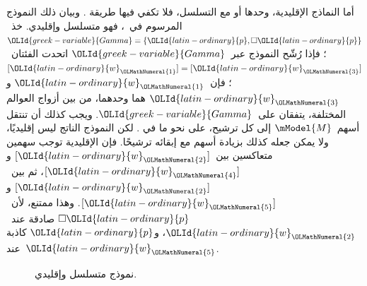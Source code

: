 \documentclass[../../../include/open-logic-section]{subfiles}
\begin{document}


أما النماذج الإقليدية، وحدها أو مع التسلسل، فلا تكفي فيها طريقة
. وبيان ذلك النموذج المرسوم في~،
فهو متسلسل وإقليدي. خذ~${\OLId{greek-variable}{Gamma}}=\{{\OLId{latin-ordinary}{p}},\Box {\OLId{latin-ordinary}{p}}\}$؛ فإذا رُشّح النموذج
عبر~${\OLId{greek-variable}{Gamma}}$ اتحدت الفئتان~$[{\OLId{latin-ordinary}{w}}_{\OLMathNumeral{1}}]=[{\OLId{latin-ordinary}{w}}_{\OLMathNumeral{3}}]$؛ فإن~${\OLId{latin-ordinary}{w}}_{\OLMathNumeral{1}}$ و${\OLId{latin-ordinary}{w}}_{\OLMathNumeral{3}}$
هما وحدهما، من بين أزواج العوالم المختلفة، يتفقان على~${\OLId{greek-variable}{Gamma}}$.
ويجب كذلك أن تنتقل أسهم~$\mModel{M}$ إلى كل ترشيح، على نحو ما في
. لكن النموذج الناتج ليس إقليديًا، ولا يمكن جعله
كذلك بزيادة أسهم مع إبقائه ترشيحًا. فإن الإقليدية توجب سهمين متعاكسين
بين~$[{\OLId{latin-ordinary}{w}}_{\OLMathNumeral{2}}]$ و$[{\OLId{latin-ordinary}{w}}_{\OLMathNumeral{4}}]$، ثم بين~$[{\OLId{latin-ordinary}{w}}_{\OLMathNumeral{2}}]$ و$[{\OLId{latin-ordinary}{w}}_{\OLMathNumeral{5}}]$.
وهذا ممتنع، لأن~$\Box {\OLId{latin-ordinary}{p}}$ صادقة عند~${\OLId{latin-ordinary}{w}}_{\OLMathNumeral{2}}$، و${\OLId{latin-ordinary}{p}}$ كاذبة عند~${\OLId{latin-ordinary}{w}}_{\OLMathNumeral{5}}$.

\begin{figure}[htpb]
  \centering
  \caption{نموذج متسلسل وإقليدي.}
\end{figure}
\end{document}
